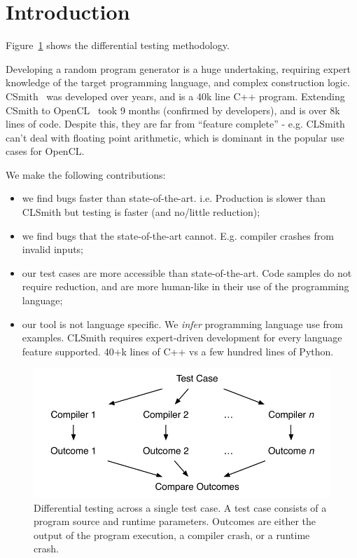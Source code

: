 \section{Introduction}\label{sec:intro}

Figure~\ref{fig:difftest} shows the differential testing methodology.

Developing a random program generator is a huge undertaking, requiring expert knowledge of the target programming language, and complex construction logic. CSmith~\cite{Yang2011} was developed over years, and is a 40k line C++ program. Extending CSmith to OpenCL~\cite{Lidbury2015a} took 9 months (confirmed by developers), and is over 8k lines of code. Despite this, they are far from ``feature complete'' - e.g. CLSmith can't deal with floating point arithmetic, which is dominant in the popular use cases for OpenCL.


We make the following contributions:
%
\begin{itemize}
\item we find bugs faster than state-of-the-art. i.e. Production is slower than CLSmith but testing is faster (and no/little reduction);
\item we find bugs that the state-of-the-art cannot. E.g. compiler crashes from invalid inputs;
\item our test cases are more accessible than state-of-the-art. Code samples do not require reduction, and are more human-like in their use of the programming language;
\item our tool is not language specific. We \emph{infer} programming language use from examples. CLSmith requires expert-driven development for every language feature supported. 40+k lines of C++ vs a few hundred lines of Python.
\end{itemize}

\begin{figure}
  \centering
  \includegraphics[width=.9\columnwidth]{img/difftest} %
  \caption{%
    Differential testing across a single test case. A test case consists of a program source and runtime parameters. Outcomes are either the output of the program execution, a compiler crash, or a runtime crash.%
  }%
  \label{fig:difftest}
\end{figure}